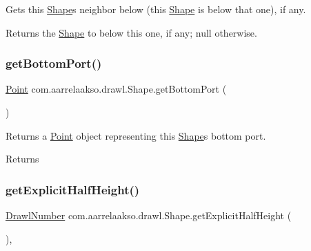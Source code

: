 Gets this \hyperlink{classcom_1_1aarrelaakso_1_1drawl_1_1_shape}{Shape}\textquotesingle{}s neighbor below (this \hyperlink{classcom_1_1aarrelaakso_1_1drawl_1_1_shape}{Shape} is below that one), if any. 

\begin{DoxyReturn}{Returns}
the \hyperlink{classcom_1_1aarrelaakso_1_1drawl_1_1_shape}{Shape} to below this one, if any; {\ttfamily null} otherwise. 
\end{DoxyReturn}
\mbox{\label{classcom_1_1aarrelaakso_1_1drawl_1_1_shape_aba14efe9a16c0808580963c66b171082}} 
\subsubsection{\texorpdfstring{get\+Bottom\+Port()}{getBottomPort()}}
{\footnotesize\ttfamily \hyperlink{classcom_1_1aarrelaakso_1_1drawl_1_1_point}{Point} com.\+aarrelaakso.\+drawl.\+Shape.\+get\+Bottom\+Port (\begin{DoxyParamCaption}{ }\end{DoxyParamCaption})\hspace{0.3cm}{\ttfamily [inherited]}}



Returns a \hyperlink{classcom_1_1aarrelaakso_1_1drawl_1_1_point}{Point} object representing this \hyperlink{classcom_1_1aarrelaakso_1_1drawl_1_1_shape}{Shape}\textquotesingle{}s bottom port. 

\begin{DoxyReturn}{Returns}

\end{DoxyReturn}
\mbox{\label{classcom_1_1aarrelaakso_1_1drawl_1_1_shape_a7207aa8ba07ed18af81fb9d92a979cd6}} 
\subsubsection{\texorpdfstring{get\+Explicit\+Half\+Height()}{getExplicitHalfHeight()}}
{\footnotesize\ttfamily \hyperlink{classcom_1_1aarrelaakso_1_1drawl_1_1_drawl_number}{Drawl\+Number} com.\+aarrelaakso.\+drawl.\+Shape.\+get\+Explicit\+Half\+Height (\begin{DoxyParamCaption}{ }\end{DoxyParamCaption})\hspace{0.3cm}{\ttfamily [protected]}, {\ttfamily [inherited]}}




